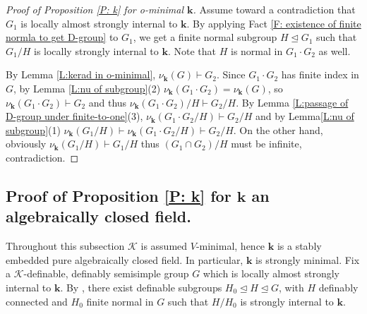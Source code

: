 \documentclass[11pt]{amsart}
\newtheorem{claim}{Claim}[theorem]
\theoremstyle{definition}
\newcommand{\bk}{\textbf{k}}
\newcommand{\CK}{{\mathcal K}}
\newcommand{\0}{\emptyset}
\begin{document}
\begin{proof}[Proof of Proposition \ref{P: k} for o-minimal $\bk$]
        Assume toward a contradiction that  $G_1$ is locally almost strongly internal to $\bk$. By applying Fact \ref{F: existence of finite normla to get D-group} to $G_1$, we get a finite normal subgroup $H\trianglelefteq G_1$ such that $G_1/H$ is locally strongly internal to $\bk$. Note that $H$ is normal in $G_1\cdot G_2$ as well.

        By Lemma \ref{L:kerad in o-minimal}, $\nu_\bk(G)\vdash G_2$. Since $G_1\cdot G_2$ has finite index in $G$, by Lemma \ref{L:nu of subgroup}(2) $\nu_\bk(G_1\cdot G_2)=\nu_\bk(G)$, so $\nu_\bk(G_1\cdot G_2)\vdash G_2$ and thus $\nu_\bk(G_1\cdot G_2)/H\vdash G_2/H$. By Lemma \ref{L:passage of D-group under finite-to-one}(3), $\nu_\bk(G_1\cdot G_2/H)\vdash G_2/H$ and by Lemma\ref{L:nu of subgroup}(1)  $\nu_\bk(G_1/H)\vdash \nu_\bk(G_1\cdot G_2/H)\vdash G_2/H$.  On the other hand,  obviously $\nu_\bk(G_1/H)\vdash G_1/H$ thus $(G_1\cap G_2)/H$ must be infinite, contradiction.
\end{proof}



\subsection{Proof of Proposition \ref{P: k} for $\bk$ an algebraically closed field.}
Throughout this subsection $\CK$ is assumed $V$-minimal, hence $\bk$ is a stably embedded pure algebraically closed field.  In particular, $\bk$ is strongly minimal. Fix a $\CK$-definable, definably semisimple group $G$ which is locally almost strongly internal to $\bk$.   By \cite[Proposition 6.2]{HaHaPeGps}, there exist definable subgroups  $H_0\trianglelefteq H\trianglelefteq G$, with $H$ definably connected and $H_0$ finite normal in $G$ such that $H/H_0$ is strongly internal to $\bk$.

\end{document}

